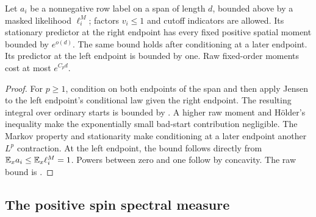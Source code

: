 \begin{corollary}
\label{cor:row-stationary-predictors}
Let $a_i$ be a nonnegative row label on a span of length $d$, bounded
above by a masked likelihood $\ell_i^M$; factors $v_i\le1$ and cutoff
indicators are allowed.  Its stationary predictor at the right endpoint
has every fixed positive spatial moment bounded by $e^{o(d)}$.
The same bound holds after conditioning at a later endpoint.  Its
predictor at the left endpoint is bounded by one.  Raw fixed-order
moments cost at most $e^{C_pd}$.
\end{corollary}

\begin{proof}
For $p\ge1$, condition on both endpoints of the span and then apply
Jensen to the left endpoint's conditional law given the right endpoint.
The resulting integral over ordinary starts is bounded by
.  A higher raw moment and H\"older's
inequality make the exponentially small bad-start contribution
negligible.  The Markov property and stationarity make conditioning at
a later endpoint another $L^p$ contraction.  At the left endpoint,
the bound follows directly from
$\mathbb E_xa_i\le\mathbb E_x\ell_i^M=1$.  Powers between zero and one follow by
concavity.  The raw bound is .
\end{proof}

\subsection{The positive spin spectral measure}

